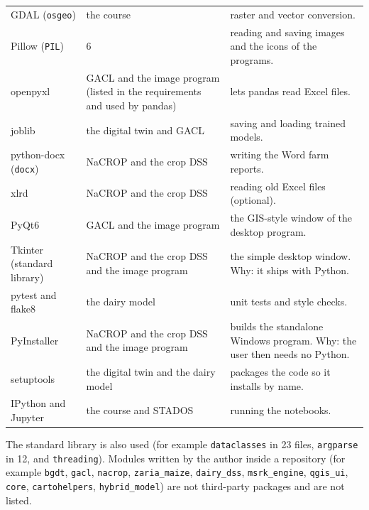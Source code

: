 \documentclass[11pt,a4paper]{article}
\begin{document}
\begin{longtable}{@{}R{2.9cm}R{3.6cm}R{8.5cm}@{}}
GDAL (\texttt{osgeo}) & the course & raster and vector conversion.\\
Pillow (\texttt{PIL}) & 6 & reading and saving images and the icons of the programs.\\
openpyxl & GACL and the image program (listed in the requirements and used by pandas) & lets pandas read Excel files.\\
joblib & the digital twin and GACL & saving and loading trained models.\\
python-docx (\texttt{docx}) & NaCROP and the crop DSS & writing the Word farm reports.\\
xlrd & NaCROP and the crop DSS & reading old Excel files (optional).\\
PyQt6 & GACL and the image program & the GIS-style window of the desktop program.\\
Tkinter (standard library) & NaCROP and the crop DSS and the image program & the simple desktop window. Why: it ships with Python.\\
pytest and flake8 & the dairy model & unit tests and style checks.\\
PyInstaller & NaCROP and the crop DSS and the image program & builds the standalone Windows program. Why: the user then needs no Python.\\
setuptools & the digital twin and the dairy model & packages the code so it installs by name.\\
IPython and Jupyter & the course and STADOS & running the notebooks.\\
\bottomrule\end{longtable}
The standard library is also used (for example \texttt{dataclasses} in 23 files, \texttt{argparse} in 12, and \texttt{threading}). Modules written by the author inside a repository (for example \texttt{bgdt}, \texttt{gacl}, \texttt{nacrop}, \texttt{zaria\_maize}, \texttt{dairy\_dss}, \texttt{msrk\_engine}, \texttt{qgis\_ui}, \texttt{core}, \texttt{cartohelpers}, \texttt{hybrid\_model}) are not third-party packages and are not listed.
\end{document}
